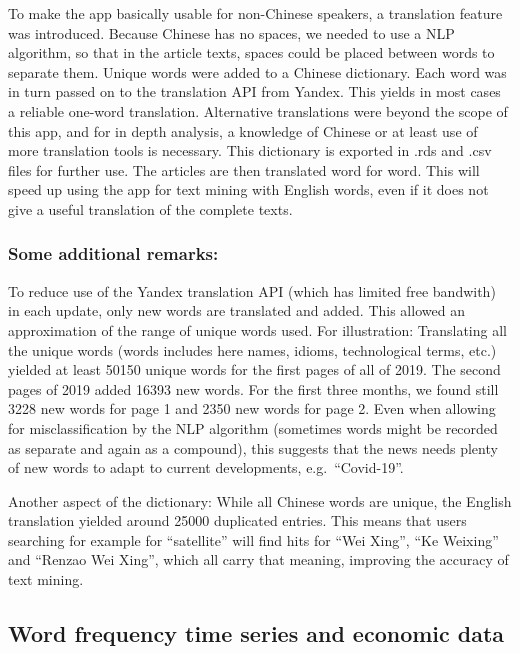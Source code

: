 \documentclass[12pt,a4paper]{article}
\begin{document}
To make the app basically usable for non-Chinese speakers, a translation
feature was introduced. Because Chinese has no spaces, we needed to use
a NLP algorithm, so that in the article texts, spaces could be placed
between words to separate them. Unique words were added to a Chinese
dictionary. Each word was in turn passed on to the translation API from
Yandex. This yields in most cases a reliable one-word translation.
Alternative translations were beyond the scope of this app, and for in
depth analysis, a knowledge of Chinese or at least use of more
translation tools is necessary. This dictionary is exported in .rds and
.csv files for further use. The articles are then translated word for
word. This will speed up using the app for text mining with English
words, even if it does not give a useful translation of the complete
texts.

\hypertarget{some-additional-remarks}{%
\subsubsection{Some additional remarks:}\label{some-additional-remarks}}

To reduce use of the Yandex translation API (which has limited free
bandwith) in each update, only new words are translated and added. This
allowed an approximation of the range of unique words used. For
illustration: Translating all the unique words (words includes here
names, idioms, technological terms, etc.) yielded at least 50150 unique
words for the first pages of all of 2019. The second pages of 2019 added
16393 new words. For the first three months, we found still 3228 new
words for page 1 and 2350 new words for page 2. Even when allowing for
misclassification by the NLP algorithm (sometimes words might be
recorded as separate and again as a compound), this suggests that the
news needs plenty of new words to adapt to current developments,
e.g.~\enquote{Covid-19}.

Another aspect of the dictionary: While all Chinese words are unique,
the English translation yielded around 25000 duplicated entries. This
means that users searching for example for \enquote{satellite} will find
hits for \enquote{Wei Xing}, \enquote{Ke Weixing} and \enquote{Renzao
Wei Xing}, which all carry that meaning, improving the accuracy of text
mining.

\hypertarget{word-frequency-time-series-and-economic-data}{%
\subsection{Word frequency time series and economic
data}\label{word-frequency-time-series-and-economic-data}}
\end{document}
